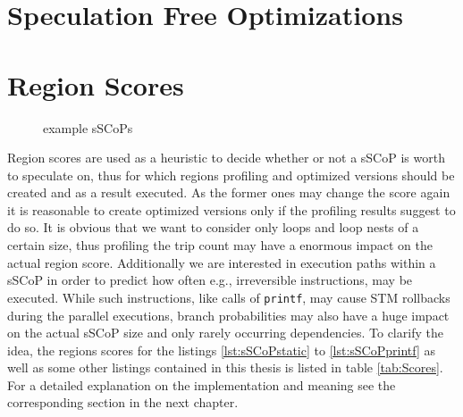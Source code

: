\section{Speculation Free Optimizations}
\label{SpeculationFreesSCoPs}





\section{Region Scores}
\label{RegionScores}
\lstset{frame=none}
\begin{figure}[h]
  \centering

  \caption{example sSCoPs}
  \label{fig:ScoredSCoPs}
\end{figure}
\resetlst
Region scores are used as a heuristic to decide whether or not a sSCoP is worth
to speculate on, thus for which regions profiling and optimized versions should
be created and as a result executed.
As the former ones may change the score again it is reasonable to create 
optimized versions only if the profiling results suggest to do so. 
It is obvious that we want to consider only loops and loop nests of a certain size,
thus profiling the trip count may have a enormous impact on the actual region score.
Additionally we are interested in execution paths within a sSCoP in order to predict how often
e.g., irreversible instructions, may be executed. While such instructions, like
calls of \texttt{printf}, may cause STM rollbacks during the parallel executions, 
branch probabilities may also have a huge impact on the actual sSCoP size and
only rarely occurring dependencies. 
To clarify the idea,  the regions scores for the listings \ref{lst:sSCoPstatic}
to \ref{lst:sSCoPprintf} as well as some other listings contained in this 
thesis is listed in table \ref{tab:Scores}. For a detailed explanation on the 
implementation and meaning see the corresponding section in the next chapter. 

